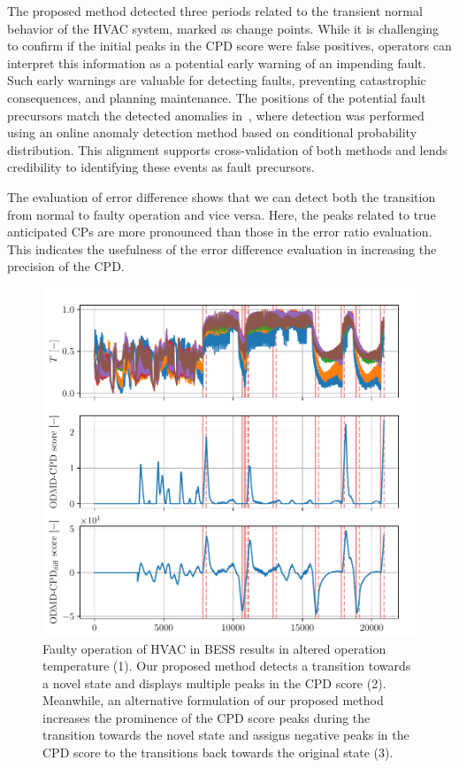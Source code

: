 The proposed method detected three periods related to the transient normal behavior of the HVAC system, marked as change points. While it is challenging to confirm if the initial peaks in the CPD score were false positives, operators can interpret this information as a potential early warning of an impending fault. Such early warnings are valuable for detecting faults, preventing catastrophic consequences, and planning maintenance. The positions of the potential fault precursors match the detected anomalies in~\citet{Wadinger2024}, where detection was performed using an online anomaly detection method based on conditional probability distribution. This alignment supports cross-validation of both methods and lends credibility to identifying these events as fault precursors.

The evaluation of error difference shows that we can detect both the transition from normal to faulty operation and vice versa. Here, the peaks related to true anticipated CPs are more pronounced than those in the error ratio evaluation. This indicates the usefulness of the error difference evaluation in increasing the precision of the CPD.

\begin{figure}[H]
	\centering
	\includegraphics[width=\linewidth]{figures/bess-chd_p10-l2880_b240_t240roll_2880-dmd_w1.0-hx20.pdf}
	\caption{Faulty operation of HVAC in BESS results in altered operation temperature (1). Our proposed method detects a transition towards a novel state and displays multiple peaks in the CPD score (2). Meanwhile, an alternative formulation of our proposed method increases the prominence of the CPD score peaks during the transition towards the novel state and assigns negative peaks in the CPD score to the transitions back towards the original state (3).}\label{fig:bess}
\end{figure}

